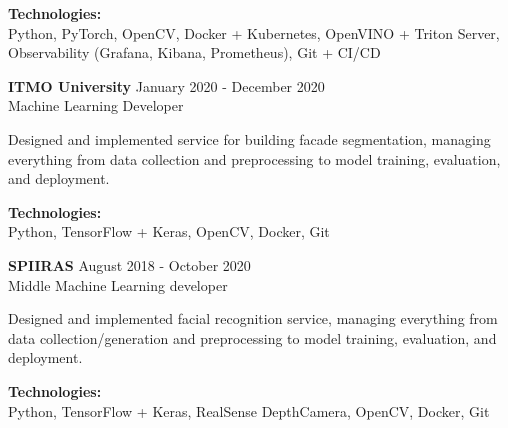 \textbf{Technologies:} \\
Python, PyTorch, OpenCV, Docker + Kubernetes, OpenVINO + Triton Server, Observability (Grafana, Kibana, Prometheus), Git + CI/CD

\textbf{ITMO University} \hfill January 2020 - December 2020 \\
Machine Learning Developer

Designed and implemented service for building facade segmentation, managing everything from data collection and preprocessing to model training, evaluation, and deployment.

\textbf{Technologies:} \\
Python, TensorFlow + Keras, OpenCV, Docker, Git

\textbf{SPIIRAS} \hfill August 2018 - October 2020 \\
Middle Machine Learning developer

Designed and implemented facial recognition service, managing everything from data collection/generation and preprocessing to model training, evaluation, and deployment.

\textbf{Technologies:} \\
Python, TensorFlow + Keras, RealSense DepthCamera, OpenCV, Docker, Git

\endinput
